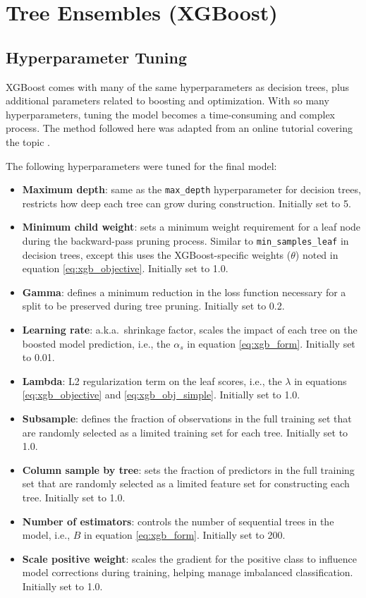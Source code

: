 \section{Tree Ensembles (XGBoost)}\label{ch5:xgb_model}

\subsection{Hyperparameter Tuning}\label{ch5:xgb_tuning}

XGBoost comes with many of the same hyperparameters as decision trees, plus additional parameters related to boosting and optimization. With so many hyperparameters, tuning the model becomes a time-consuming and complex process. The method followed here was adapted from an online tutorial covering the topic \citep{jain_xgboost_2016}.

The following hyperparameters were tuned for the final model:
\begin{itemize}[itemsep=2pt]
    \item \textbf{Maximum depth}: same as the \verb|max_depth| hyperparameter for decision trees, restricts how deep each tree can grow during construction. Initially set to 5.
    \item \textbf{Minimum child weight}: sets a minimum weight requirement for a leaf node during the backward-pass pruning process. Similar to \verb|min_samples_leaf| in decision trees, except this uses the XGBoost-specific weights ($\theta$) noted in equation \ref{eq:xgb_objective}. Initially set to 1.0.
    \item \textbf{Gamma}: defines a minimum reduction in the loss function necessary for a split to be preserved during tree pruning. Initially set to 0.2.
    \item \textbf{Learning rate}: a.k.a.\ shrinkage factor, scales the impact of each tree on the boosted model prediction, i.e., the $\alpha_s$ in equation \ref{eq:xgb_form}. Initially set to 0.01.
    \item \textbf{Lambda}: L2 regularization term on the leaf scores, i.e., the $\lambda$ in equations \ref{eq:xgb_objective} and \ref{eq:xgb_obj_simple}. Initially set to 1.0.
    \item \textbf{Subsample}: defines the fraction of observations in the full training set that are randomly selected as a limited training set for each tree. Initially set to 1.0.
    \item \textbf{Column sample by tree}: sets the fraction of predictors in the full training set that are randomly selected as a limited feature set for constructing each tree. Initially set to 1.0.
    \item \textbf{Number of estimators}: controls the number of sequential trees in the model, i.e., $B$ in equation \ref{eq:xgb_form}. Initially set to 200.
    \item \textbf{Scale positive weight}: scales the gradient for the positive class to influence model corrections during training, helping manage imbalanced classification. Initially set to 1.0.
\end{itemize}

